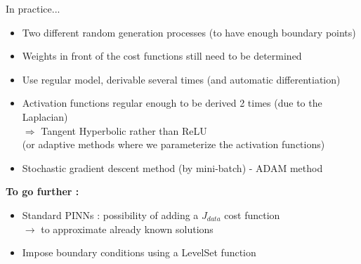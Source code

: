 \begin{frame}{In practice...}
	\begin{itemize}[]
		\item Two different random generation processes (to have enough boundary points)
		
		\item Weights in front of the cost functions still need to be determined
		
		\item Use regular model, derivable several times (and automatic differentiation)
		
		\item Activation functions regular enough to be derived 2 times (due to the Laplacian) \\
		$\Rightarrow$ Tangent Hyperbolic rather than ReLU \\
		(or adaptive methods where we parameterize the activation functions)
		
		\item Stochastic gradient descent method (by mini-batch) - ADAM method 		
	\end{itemize}

	\textbf{To go further :}
	\begin{itemize}[]				
		\item Standard PINNs : possibility of adding a $J_{data}$ cost function \\
		$\rightarrow$ to approximate already known solutions
		
		\item Impose boundary conditions using a LevelSet function
	\end{itemize}
\end{frame}

